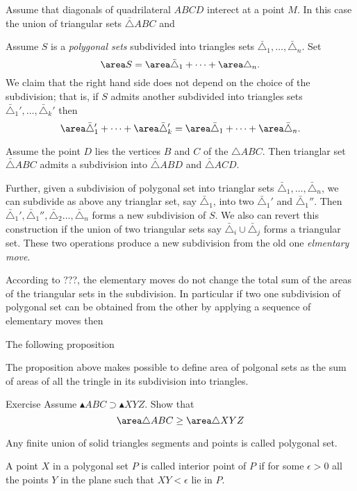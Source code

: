 {Assume that diagonals of quadrilateral $ABCD$ interect at a point $M$.
In this case the union of triangular sets $\bar\triangle ABC$ and 

Assume $S$ is a \emph{polygonal sets} subdivided into triangles sets $\bar\triangle_1,\dots,\bar\triangle_n$.
Set 
\[\area S=\area\bar\triangle_1+\dots+\area\triangle_n.\]
We claim that the right hand side does not depend on the choice of the subdivision; 
that is, if $S$ admits another subdivided into triangles sets $\bar\triangle_1',\dots,\bar\triangle_k'$
then 
\[\area\bar\triangle'_1+\dots+\area\bar\triangle'_k
=
\area\bar\triangle_1+\dots+\area\bar\triangle_n.\]


Assume the point $D$ lies the vertices $B$ and $C$ of the $\triangle ABC$.
Then trianglar set $\bar\triangle ABC$ admits a subdivision into  $\bar\triangle ABD$ and $\bar\triangle ACD$.

Further, given a subdivision of polygonal set into trianglar sets $\bar\triangle_1,\dots,\bar\triangle_n$,
we can subdivide as above 
any trianglar set, say $\bar\triangle_1$,
into two $\bar\triangle_1'$ and $\bar\triangle_1''$.
Then 
$\bar\triangle_1',\bar\triangle_1'',\bar\triangle_2\dots,\bar\triangle_n$
forms a new subdivision of $S$.
We also can revert this construction if the union of two triangular sets 
say $\bar\triangle_i\cup \bar\triangle_j$ forms a triangular set.
These two operations produce a new subdivision from the old one \emph{elmentary move}.

According to ???,
the elementary moves do not change the total sum of the areas of the triangular sets in the subdivision.
In particular if two one subdivision of polygonal set can be obtained from the other by applying a sequence of elementary moves then 

The following proposition 



The proposition above makes possible to define area of polgonal sets
as the sum of areas of all the tringle in its subdivision into triangles.


\begin{thm}{Exercise}
Assume $\blacktriangle ABC\supset \blacktriangle XYZ$.
Show that 
\[\area \triangle ABC\ge \area \triangle XYZ\]

\end{thm}


Any finite union of solid triangles segments and points is called polygonal set.

A point $X$ in a polygonal set $P$ is called interior point of $P$ 
if for some $\epsilon>0$ all the points $Y$ in the plane such that $XY<\epsilon$ lie in $P$.

}
